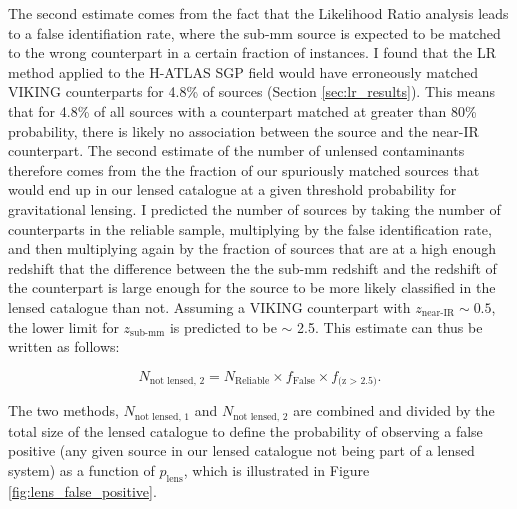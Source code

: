 The second estimate comes from the fact that the Likelihood Ratio analysis leads to a false identifiation rate, where the sub-mm source is expected to be matched to the wrong counterpart in a certain fraction of instances. I found that the LR method applied to the H-ATLAS SGP field would have erroneously matched VIKING counterparts for 4.8\% of sources (Section \ref{sec:lr_results}). This means that for 4.8\% of all sources with a counterpart matched at greater than 80\% probability, there is likely no association between the source and the near-IR counterpart. The second estimate of the number of unlensed contaminants therefore comes from the the fraction of our spuriously matched sources that would end up in our lensed catalogue at a given threshold probability for gravitational lensing. I predicted the number of sources by taking the number of counterparts in the reliable sample, multiplying by the false identification rate, and then multiplying again by the fraction of sources that are at a high enough redshift that the difference between the the sub-mm redshift and the redshift of the counterpart is large enough for the source to be more likely classified in the lensed catalogue than not. Assuming a VIKING counterpart with $z_\textrm{near-IR} \sim 0.5$, the lower limit for $z_\textrm{sub-mm}$ is predicted to be $\sim$ 2.5. This estimate can thus be written as follows:

\begin{equation}
N_{\textrm{not lensed, 2}} = N_{\textrm{Reliable}} \times f_{\textrm{False}} \times f_{\textrm{(z > 2.5)}}.
\end{equation} 

The two methods, $N_{\textrm{not lensed, 1}}$ and $N_{\textrm{not lensed, 2}}$ are combined and divided by the total size of the lensed catalogue to define the probability of observing a false positive (any given source in our lensed catalogue not being part of a lensed system) as a function of $p_{\textrm{lens}}$, which is illustrated in Figure \ref{fig:lens_false_positive}.

